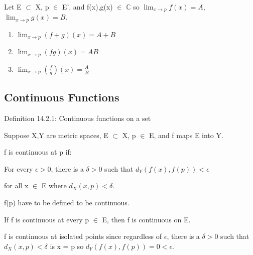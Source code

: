     \begin{adjustbox}{minipage=14cm, right, vspace=0.1cm 0cm}
        Let E $\subset$ X, p $\in$ E', and f(x),g(x) $\in$ $\mathbb{C}$ so 
        $\lim_{x \rightarrow p} f(x) = A$, $\lim_{x \rightarrow p} g(x) = B$.
    \end{adjustbox}

    \vspace{0.2cm}

    \begin{enumerate}[label=(\alph*), leftmargin=2cm, itemsep=0.1cm]
        \item $\lim_{x \rightarrow p} (f+g)(x) = A+B$
        \item $\lim_{x \rightarrow p} (fg)(x) = AB$
        \item $\lim_{x \rightarrow p} (\frac{f}{g})(x) = \frac{A}{B}$
    \end{enumerate}





\subsection{ Continuous Functions }

{ \color{blue} Definition 14.2.1: Continuous functions on a set }

    \begin{adjustbox}{minipage=14cm, right, vspace=0.1cm 0cm}
        Suppose X,Y are metric spaces, E $\subset$ X, p $\in$ E, and
        f maps E into Y.

        f is continuous at p if:
        
        \begin{adjustbox}{minipage=13cm, right, vspace=0.1cm 0cm}
            For every $\epsilon > 0$, there is a
            $\delta > 0$ such that $d_Y(f(x),f(p)) < \epsilon$
            
            for all x $\in$ E where $d_X(x,p) < \delta$.
        \end{adjustbox}

        f(p) have to be defined to be continuous.

        If f is continuous at every p $\in$ E, then f is continuous on E.

        f is continuous at isolated points since regardless of $\epsilon$,
        there is a $\delta > 0$ such that $d_X(x,p) < \delta$ is x = p so
        $d_Y(f(x),f(p)) = 0 < \epsilon$.
    \end{adjustbox}

